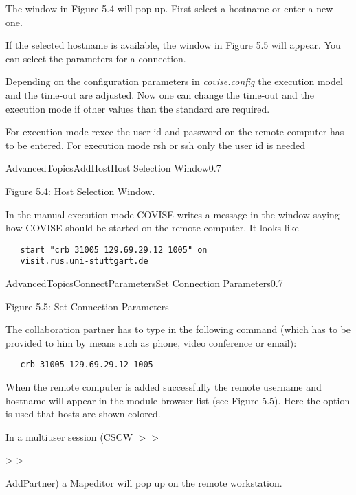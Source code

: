 The window in Figure 5.4 will pop up. First select a hostname or enter a new one. 

If the selected hostname is available, the window in Figure 5.5 will appear. You 
can select the parameters for a connection.

Depending on the configuration parameters in {\it covise.config} the execution model 
and the time-out are adjusted. Now one can change the time-out and the execution mode 
if other values than the standard are required. 

For execution mode rexec the user id and password on the remote computer has to
be entered. For execution mode rsh or ssh only the user id is needed

\begin{covimg}{AdvancedTopics}{AddHost}{Host Selection Window}{0.7}\end{covimg}
\begin{htmlonly}
Figure 5.4: Host Selection Window.
\vspace{0.5cm}
\end{htmlonly}


In the manual execution mode COVISE writes a message in the window saying how COVISE 
should be started on the remote computer. It looks like 

\begin{verbatim}
   start "crb 31005 129.69.29.12 1005" on 
   visit.rus.uni-stuttgart.de
\end{verbatim}


\begin{covimg}{AdvancedTopics}{ConnectParameters}{Set Connection Parameters}{0.7}\end{covimg}
\begin{htmlonly}
Figure 5.5: Set Connection Parameters
\vspace{0.5cm}
\end{htmlonly}

The collaboration partner has to type in the following command (which has to be 
provided to him by means such as phone, video conference or email):
\begin{verbatim}
   crb 31005 129.69.29.12 1005
\end{verbatim}
                                     
When the remote computer is added successfully the remote username and hostname will 
appear in the module browser list (see Figure 5.5). Here the option is used that hosts 
are shown colored.

In a multiuser session (CSCW \latexonly $>>$ \endlatexonly \begin{htmlonly} > >
\end{htmlonly} AddPartner) a Mapeditor will pop up on the remote workstation.

